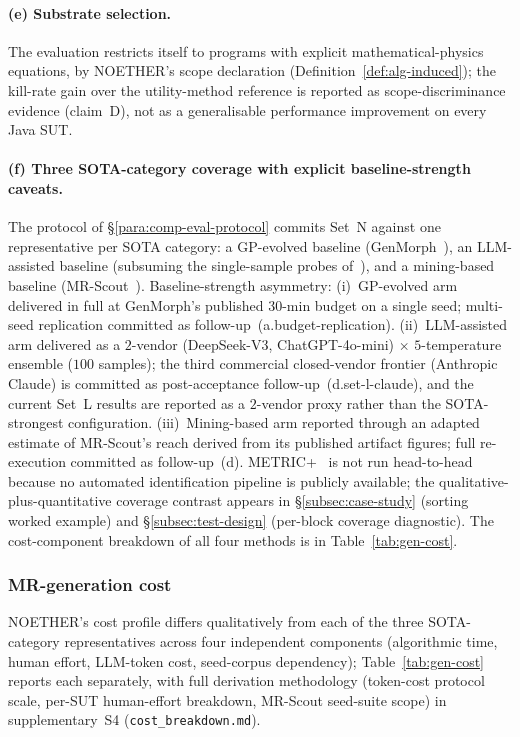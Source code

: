 \documentclass[acmsmall, screen]{acmart}
\begin{document}
\paragraph{(e) Substrate selection.}
The evaluation restricts itself to programs with explicit mathematical-physics equations, by NOETHER's scope declaration (Definition~\ref{def:alg-induced}); the kill-rate gain over the utility-method reference is reported as scope-discriminance evidence (claim~D), not as a generalisable performance improvement on every Java SUT.

\paragraph{(f) Three SOTA-category coverage with explicit baseline-strength caveats.}
The protocol of \S\ref{para:comp-eval-protocol} commits Set~N against one representative per SOTA category: a GP-evolved baseline (GenMorph~\cite{GenMorph2024}), an LLM-assisted baseline (subsuming the single-sample probes of~\cite{Shin2024,ZhangChatGPTMR2023,GPTMR2025,AutoMT2025}), and a mining-based baseline (MR-Scout~\cite{MRScout2024}). Baseline-strength asymmetry: (i)~GP-evolved arm delivered in full at GenMorph's published 30-min budget on a single seed; multi-seed replication committed as follow-up~(a.budget-replication). (ii)~LLM-assisted arm delivered as a $2$-vendor (DeepSeek-V3, ChatGPT-4o-mini) $\times$ $5$-temperature ensemble ($100$ samples); the third commercial closed-vendor frontier (Anthropic Claude) is committed as post-acceptance follow-up~(d.set-l-claude), and the current Set~L results are reported as a $2$-vendor proxy rather than the SOTA-strongest configuration. (iii)~Mining-based arm reported through an adapted estimate of MR-Scout's reach derived from its published artifact figures; full re-execution committed as follow-up~(d). METRIC+~\cite{SunMETRICplus2021} is not run head-to-head because no automated identification pipeline is publicly available; the qualitative-plus-quantitative coverage contrast appears in \S\ref{subsec:case-study} (sorting worked example) and \S\ref{subsec:test-design} (per-block coverage diagnostic). The cost-component breakdown of all four methods is in Table~\ref{tab:gen-cost}.

\subsubsection{MR-generation cost}
\label{subsec:gen-cost}

NOETHER's cost profile differs qualitatively from each of the three SOTA-category representatives across four independent components (algorithmic time, human effort, LLM-token cost, seed-corpus dependency); Table~\ref{tab:gen-cost} reports each separately, with full derivation methodology (token-cost protocol scale, per-SUT human-effort breakdown, MR-Scout seed-suite scope) in supplementary~S4 (\texttt{cost\_breakdown.md}).
\end{document}
